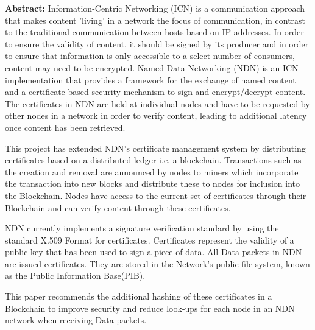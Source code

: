 \documentclass[a4paper, 12pt, oneside]{report}         %
\begin{document}
\begin{thesisabstract}

\textbf{Abstract:} Information-Centric Networking (ICN) is a communication approach that 
makes content 'living' in a network the focus of communication, in 
contrast to the traditional communication between hosts based on IP 
addresses. In order to ensure the validity of content, it should be 
signed by its producer and  in order to ensure that information is only 
accessible to a select number of consumers, content may need to be 
encrypted. Named-Data Networking (NDN) is an ICN implementation that 
provides a framework for the exchange of named content and a 
certificate-based security mechanism to sign and encrypt/decrypt 
content. The certificates in NDN are held at individual nodes and have 
to be requested by other nodes in a network in order to verify content, 
leading to additional latency once content has been retrieved.

This project has extended NDN's certificate management system by 
distributing certificates based on a distributed ledger i.e. a 
blockchain. Transactions such as the creation and removal are announced 
by nodes to miners which incorporate the transaction into new blocks and 
distribute these to nodes for inclusion into the Blockchain. Nodes have 
access to the current set of certificates through their Blockchain and 
can verify content through these certificates.

NDN currently implements a signature verification standard by using the standard X.509 Format for certificates. Certificates represent the validity of a public key that has been used to sign a piece of data. All Data packets in NDN are issued certificates. They are stored in the Network's public file system, known as the Public Information Base(PIB).

This paper recommends the additional hashing of these certificates in a Blockchain to improve security and reduce look-ups for each node in an NDN network when receiving Data packets.
\end{thesisabstract}

\tableofcontents                                  %
\listoftables                                     %
\listoffigures                                    %

                                  
                                  
  
  
  
  
  
\end{document}
